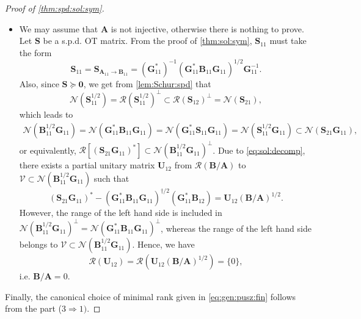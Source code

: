 \documentclass[noinfoline]{imsart}\setcounter{tocdepth}{2}
\newcommand{\m}[1]{\mathbf{#1}} %
\renewcommand{\c}[1]{\mathcal{#1}} %
\theoremstyle{plain}
\begin{document}
\begin{proof}[Proof of \cref{thm:spd:sol:sym}]
\begin{itemize}[leftmargin=*]
\item [($1 \Rightarrow 3)$] We may assume that $\m{A}$ is not injective, otherwise there is nothing to prove. Let $\m{S}$ be a s.p.d. OT matrix. From the proof of \cref{thm:sol:sym}, $\m{S}_{11}$ must take the form
\begin{equation*}
    \m{S}_{11} = \m{S}_{\m{A}_{11} \to \m{B}_{11}} = (\m{G}_{11}^{*})^{-1} (\m{G}_{11}^{*} \m{B}_{11} \m{G}_{11})^{1/2} \m{G}_{11}^{-1}.
\end{equation*}
Also, since $\m{S} \succeq \m{0}$, we get from \cref{lem:Schur:spd} that
\begin{equation*}
    \c{N}(\m{S}_{11}^{1/2}) = \c{R}(\m{S}_{11}^{1/2})^{\perp} \subset \c{R}(\m{S}_{12})^{\perp} = \c{N}(\m{S}_{21}),
\end{equation*}
which leads to
\begin{align*}
    \c{N}(\m{B}_{11}^{1/2} \m{G}_{11}) = \c{N}(\m{G}_{11}^{*} \m{B}_{11} \m{G}_{11}) = \c{N} (\m{G}_{11}^{*} \m{S}_{11} \m{G}_{11}) = \c{N}(\m{S}_{11}^{1/2} \m{G}_{11}) \subset \c{N}(\m{S}_{21} \m{G}_{11}),
\end{align*}
or equivalently, $\c{R}[(\m{S}_{21} \m{G}_{11})^{*}] \subset \c{N}(\m{B}_{11}^{1/2} \m{G}_{11})^{\perp}$. Due to \eqref{eq:sol:decomp}, there exists a partial unitary matrix $\m{U}_{12}$ from $\c{R}(\m{B}/\m{A})$ to $\mathcal{V} \subset \c{N}(\m{B}_{11}^{1/2} \m{G}_{11})$ such that
\begin{equation*}
    (\m{S}_{21} \m{G}_{11})^{*} - (\m{G}_{11}^{*} \m{B}_{11} \m{G}_{11})^{\dagger/2} (\m{G}_{11}^{*} \m{B}_{12}) = \m{U}_{12} (\m{B}/\m{A})^{1/2}.
\end{equation*}
However, the range of the left hand side is included in $\c{N}(\m{B}_{11}^{1/2} \m{G}_{11})^{\perp} = \c{N}(\m{G}_{11}^{*} \m{B}_{11} \m{G}_{11})^{\perp}$, whereas the range of the left hand side belongs to $\mathcal{V} \subset \c{N}(\m{B}_{11}^{1/2} \m{G}_{11})$. Hence, we have
\begin{equation*}
    \c{R}(\m{U}_{12}) = \c{R}(\m{U}_{12} (\m{B}/\m{A})^{1/2}) = \{0\},
\end{equation*}
i.e. $\m{B}/\m{A} =0$.
\end{itemize}
Finally, the canonical choice of minimal rank given in \eqref{eq:gen:pusz:fin} follows from the part ($3 \Rightarrow 1)$.
\end{proof}
\end{document}
